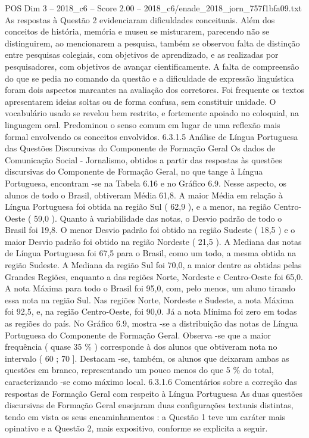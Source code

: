 \begin{textsample}{POS Dim 3 – 2018\_c6 – Score 2.00 – 2018\_c6/enade\_2018\_jorn\_757f1bfa09.txt}
As respostas à Questão 2 evidenciaram dificuldades conceituais.
Além dos conceitos de história, memória e museu se misturarem, parecendo não se distinguirem, ao mencionarem a pesquisa, também se observou falta de distinção entre pesquisas colegiais, com objetivos de aprendizado, e as realizadas por pesquisadores, com objetivos de avançar cientificamente.
A falta de compreensão do que se pedia no comando da questão e a dificuldade de expressão linguística foram dois aspectos marcantes na avaliação dos corretores.
Foi frequente os textos apresentarem ideias soltas ou de forma confusa, sem constituir unidade.
O vocabulário usado se revelou bem restrito, e fortemente apoiado no coloquial, na linguagem oral.
Predominou o senso comum em lugar de uma reflexão mais formal envolvendo os conceitos envolvidos. 6.3.1.5 Análise de Língua Portuguesa das Questões Discursivas do Componente de Formação Geral Os dados de Comunicação Social - Jornalismo, obtidos a partir das respostas às questões discursivas do Componente de Formação Geral, no que tange à Língua Portuguesa, encontram -se na Tabela 6.16 e no Gráfico 6.9.
Nesse aspecto, os alunos de todo o Brasil, obtiveram Média 61,8.
A maior Média em relação à Língua Portuguesa foi obtida na região Sul ( 62,9 ), e a menor, na região Centro-Oeste ( 59,0 ).
Quanto à variabilidade das notas, o Desvio padrão de todo o Brasil foi 19,8.
O menor Desvio padrão foi obtido na região Sudeste ( 18,5 ) e o maior Desvio padrão foi obtido na região Nordeste ( 21,5 ).
A Mediana das notas de Língua Portuguesa foi 67,5 para o Brasil, como um todo, a mesma obtida na região Sudeste.
A Mediana da região Sul foi 70,0, a maior dentre as obtidas pelas Grandes Regiões, enquanto a das regiões Norte, Nordeste e Centro-Oeste foi 65,0.
A nota Máxima para todo o Brasil foi 95,0, com, pelo menos, um aluno tirando essa nota na região Sul.
Nas regiões Norte, Nordeste e Sudeste, a nota Máxima foi 92,5, e, na região Centro-Oeste, foi 90,0.
Já a nota Mínima foi zero em todas as regiões do país.
No Gráfico 6.9, mostra -se a distribuição das notas de Língua Portuguesa do Componente de Formação Geral.
Observa -se que a maior frequência ( quase 35 \% ) corresponde à dos alunos que obtiveram nota no intervalo ( 60 ; 70 ].
Destacam -se, também, os alunos que deixaram ambas as questões em branco, representando um pouco menos do que 5 \% do total, caracterizando -se como máximo local. 6.3.1.6 Comentários sobre a correção das respostas de Formação Geral com respeito à Língua Portuguesa As duas questões discursivas de Formação Geral ensejaram duas configurações textuais distintas, tendo em vista os seus encaminhamentos : a Questão 1 teve um caráter mais opinativo e a Questão 2, mais expositivo, conforme se explicita a seguir.

\end{textsample}
